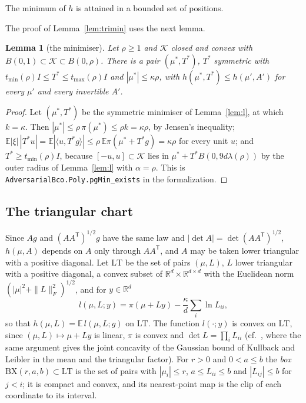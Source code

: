 \documentclass[11pt]{amsart}
\newtheorem{lemma}[theorem]{Lemma}
\theoremstyle{definition}
\numberwithin{equation}{section}
\newcommand{\R}{\mathbb{R}}
\newcommand{\E}{\mathbb{E}}
\newcommand{\cK}{\mathcal{K}}
\newcommand{\ip}[1]{\langle #1\rangle}
\begin{document}
The minimum of $h$ is attained in a bounded set of positions.

The proof of Lemma~\ref{lem:trimin} uses the next lemma.

\begin{lemma}[the minimiser]\label{lem:pgmin}
Let $\rho\ge1$ and $\cK$ closed and convex with $B(0,1)\subset\cK\subset B(0,\rho)$. There is a pair $(\mu^*,T^*)$, $T^*$ symmetric with $t_{\min}(\rho)I\le T^*\le t_{\max}(\rho)I$ and $|\mu^*|\le\kappa\rho$, with $h(\mu^*,T^*)\le h(\mu',A')$ for every $\mu'$ and every invertible $A'$.
\end{lemma}

\begin{proof}
Let $(\mu^*,T^*)$ be the symmetric minimiser of Lemma~\ref{lem:l}, at which $k=\kappa$. Then $|\mu^*|\le\rho\,\pi(\mu^*)\le\rho k=\kappa\rho$, by Jensen's inequality; $\E|\xi|\,|T^*u|=\E|\ip{u,T^*g}|\le\rho\,\E\pi(\mu^*+T^*g)=\kappa\rho$ for every unit $u$; and $T^*\ge t_{\min}(\rho)I$, because $[-u,u]\subset\cK$ lies in $\mu^*+T^*B(0,9d\lambda(\rho))$ by the outer radius of Lemma~\ref{lem:l} with $\alpha=\rho$.
This is \texttt{AdversarialBco.Poly.pgMin\_exists} in the formalization.
\end{proof}

\subsection{The triangular chart}

Since $Ag$ and $(AA^{\mathsf T})^{1/2}g$ have the same law and $|\det A|=\det(AA^{\mathsf T})^{1/2}$, $h(\mu,A)$ depends on $A$ only through $AA^{\mathsf T}$, and $A$ may be taken lower triangular with a positive diagonal. Let $\mathrm{LT}$ be the set of pairs $(\mu,L)$, $L$ lower triangular with a positive diagonal, a convex subset of $\R^d\times\R^{d\times d}$ with the Euclidean norm $(|\mu|^2+\|L\|_F^2)^{1/2}$, and for $y\in\R^d$
\[
l(\mu,L;y)=\pi(\mu+Ly)-\frac\kappa d\sum_i\ln L_{ii},
\]
so that $h(\mu,L)=\E\,l(\mu,L;g)$ on $\mathrm{LT}$. The function $l(\cdot;y)$ is convex on $\mathrm{LT}$, since $(\mu,L)\mapsto\mu+Ly$ is linear, $\pi$ is convex and $\det L=\prod_iL_{ii}$ (cf.\ \cite[Section~3.2]{CB13}, where the same argument gives the joint concavity of the Gaussian bound of Kullback and Leibler in the mean and the triangular factor). For $r>0$ and $0<a\le b$ the \emph{box} $\mathrm{BX}(r,a,b)\subset\mathrm{LT}$ is the set of pairs with $|\mu_i|\le r$, $a\le L_{ii}\le b$ and $|L_{ij}|\le b$ for $j<i$; it is compact and convex, and its nearest-point map is the clip of each coordinate to its interval.
\end{document}
